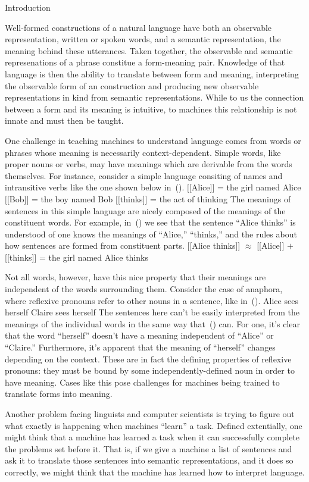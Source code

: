 \sec Introduction

Well-formed constructions of a natural language have both an observable 
representation, written or spoken words, and a semantic representation, the
meaning behind these utterances. Taken together, the observable and semantic
represenations of a phrase constitue a form-meaning pair. Knowledge of that
language is then the ability to translate between form and meaning, 
interpreting the observable form of an construction and producing new 
observable representations in kind from semantic representations. While to us
the connection between a form and its meaning is intuitive, to machines this
relationship is not innate and must then be taught. 

One challenge in teaching machines to understand language comes from words or
phrases whose meaning is necessarily context-dependent. Simple words, like
proper nouns or verbs, may have meanings which are derivable from the words 
themselves. For instance, consider a simple language consiting of names and
intransitive verbs like the one shown below in~(\nextx).
\pex
	\a{} $[[$Alice$]]$ = the girl named Alice
	\a{} $[\![$Bob$]\!]$ = the boy named Bob
	\a{} $[\![$thinks$]\!]$ = the act of thinking
\xe
The meanings of sentences in this simple language are nicely composed of the
meanings of the constituent words. For example, in~(\nextx) we see that the
sentence ``Alice thinks'' is understood of one knows the meanings of ``Alice,''
``thinks,'' and the rules about how sentences are formed from constituent 
parts.
\ex{}
	[[Alice thinks]] $\approx$ [[Alice]] $+$ [[thinks]] = the girl named Alice thinks
\xe

Not all words, however, have this nice property that their meanings are 
independent of the words surrounding them. Consider the case of anaphora, where
reflexive pronouns refer to other nouns in a sentence, like in~(\nextx).
\pex
	\a Alice sees herself
	\a Claire sees herself
\xe
The sentences here can't be easily interpreted from the meanings of the 
individual words in the same way that~(\blastx) can. For one, it's clear that
the word ``herself'' doesn't have a meaning independent of ``Alice'' or 
``Claire.'' Furthermore, it's apparent that the meaning of ``herself'' changes
depending on the context. These are in fact the defining properties of 
reflexive pronouns: they must be bound by some independently-defined noun in
order to have meaning. Cases like this pose challenges for machines being
trained to translate forms into meaning.

Another problem facing linguists and computer scientists is trying to
figure out what exactly is happening when machines ``learn'' a task. Defined
extentially, one might think that a machine has learned a task when it can 
successfully complete the problems set before it. That is, if we give a machine
a list of sentences and ask it to translate those sentences into semantic
representations, and it does so correctly, we might think that the machine
has learned how to interpret language.

